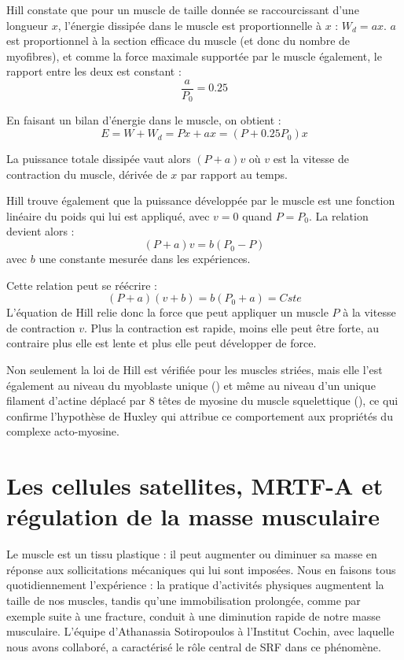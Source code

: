 Hill constate que pour un muscle de taille donnée se raccourcissant d'une longueur $x$, l'énergie dissipée dans le muscle est proportionnelle à $x$ : $W_d=ax$. $a$ est proportionnel à la section efficace du muscle (et donc du nombre de myofibres), et comme la force maximale supportée par le muscle également, le rapport entre les deux  est constant : $$\frac{a}{P_0}=0.25$$

En faisant un bilan d'énergie dans le muscle, on obtient : 
$$ E=W+W_d=Px+ax=(P+0.25P_0)x$$

La puissance totale dissipée vaut alors $(P+a)v$ où $v$ est la vitesse de contraction du muscle, dérivée de $x$ par rapport au temps. 

Hill trouve également que la puissance développée par le muscle est une fonction linéaire du poids qui lui est appliqué, avec $v=0$ quand $P=P_0$. 
La relation devient alors : 
$$ (P+a)v=b(P_0-P)$$
avec $b$ une constante mesurée dans les expériences. 

Cette relation peut se réécrire : 
\begin{equation}
\label{Hill}
(P+a)(v+b)=b(P_0+a)=Cste
\end{equation}
L'équation de Hill relie donc la force que peut appliquer un muscle $P$ à la vitesse de contraction $v$. Plus la contraction est rapide, moins elle peut être forte, au contraire plus elle est lente et plus elle peut développer de force. 

Non seulement la loi de Hill est vérifiée pour les muscles striées, mais elle l'est également au niveau du myoblaste unique (\cite{mitrossilis_single-cell_2009}) et même au niveau d'un unique filament d'actine déplacé par 8 têtes de myosine du muscle squelettique (\cite{debold_slip_2005}), ce qui confirme l'hypothèse de Huxley qui attribue ce comportement aux propriétés du complexe acto-myosine. 

\section{Les cellules satellites, MRTF-A et régulation de la masse musculaire}

Le muscle est un tissu plastique : il peut augmenter ou diminuer sa masse en réponse aux sollicitations mécaniques qui lui sont imposées. Nous en faisons tous quotidiennement l'expérience : la pratique d'activités physiques augmentent la taille de nos muscles, tandis qu'une immobilisation prolongée, comme par exemple suite à une fracture, conduit à une diminution rapide de notre masse musculaire. L'équipe d'Athanassia Sotiropoulos à l'Institut Cochin, avec laquelle nous avons collaboré, a caractérisé le rôle central de SRF dans ce phénomène. 

